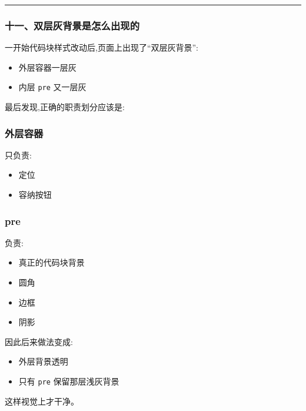 \documentclass[lang=cn,scheme=chinese,color=blue,device=normal,toc=onecol,math=cm]{elegantbook}
\begin{document}
\medskip\hrule\medskip


\subsubsection{十一、双层灰背景是怎么出现的}


一开始代码块样式改动后,页面上出现了“双层灰背景”:\par


\begin{itemize}
\item 外层容器一层灰
\item 内层 \texttt{pre} 又一层灰
\end{itemize}


最后发现,正确的职责划分应该是:\par


\subsubsection{外层容器}


只负责:\par


\begin{itemize}
\item 定位
\item 容纳按钮
\end{itemize}


\subsubsection{pre}


负责:\par


\begin{itemize}
\item 真正的代码块背景
\item 圆角
\item 边框
\item 阴影
\end{itemize}


因此后来做法变成:\par


\begin{itemize}
\item 外层背景透明
\item 只有 \texttt{pre} 保留那层浅灰背景
\end{itemize}


这样视觉上才干净。\par
\end{document}
